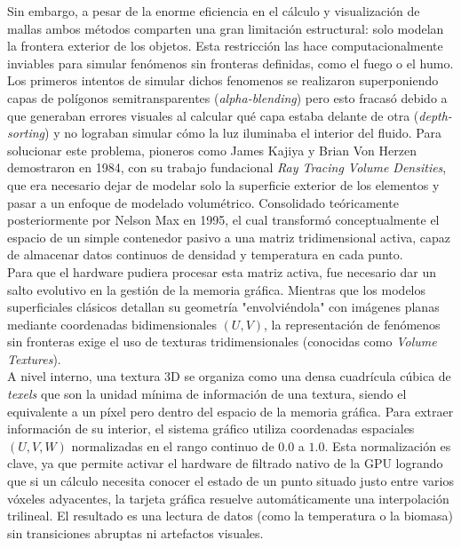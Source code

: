     Sin embargo, a pesar de la enorme eficiencia en el cálculo y visualización de mallas ambos métodos comparten una gran limitación estructural: solo modelan la frontera exterior de los objetos. Esta restricción las hace computacionalmente inviables para simular fenómenos sin fronteras definidas, como el fuego o el humo.\\

    Los primeros intentos de simular dichos fenomenos se realizaron superponiendo capas de polígonos semitransparentes (\textit{alpha-blending}) pero esto fracasó debido a que generaban errores visuales al calcular qué capa estaba delante de otra (\textit{depth-sorting}) y no lograban simular cómo la luz iluminaba el interior del fluido. Para solucionar este problema, pioneros como James Kajiya y Brian Von Herzen demostraron en 1984, con su trabajo fundacional \textit{Ray Tracing Volume Densities}\cite{VolumeDensities}, que era necesario dejar de modelar solo la superficie exterior de los elementos y pasar a un enfoque de modelado volumétrico. Consolidado teóricamente posteriormente por Nelson Max en 1995\cite{max2002optical}, el cual transformó conceptualmente el espacio de un simple contenedor pasivo a una matriz tridimensional activa, capaz de almacenar datos continuos de densidad y temperatura en cada punto. \\

    Para que el hardware pudiera procesar esta matriz activa, fue necesario dar un salto evolutivo en la gestión de la memoria gráfica. Mientras que los modelos superficiales clásicos detallan su geometría "envolviéndola" con imágenes planas mediante coordenadas bidimensionales $ (U, V) $, la representación de fenómenos sin fronteras exige el uso de texturas tridimensionales (conocidas como \textit{Volume Textures}).\\

    A nivel interno, una textura 3D se organiza como una densa cuadrícula cúbica de \textit{texels} que son la unidad mínima de información de una textura, siendo el equivalente a un píxel pero dentro del espacio de la memoria gráfica.  Para extraer información de su interior, el sistema gráfico utiliza coordenadas espaciales $ (U, V, W) $ normalizadas en el rango continuo de $0.0$ a $1.0$. Esta normalización es clave, ya que permite activar el hardware de filtrado nativo de la GPU logrando que si un cálculo necesita conocer el estado de un punto situado justo entre varios vóxeles adyacentes, la tarjeta gráfica resuelve automáticamente una interpolación trilineal. El resultado es una lectura de datos (como la temperatura o la biomasa) sin transiciones abruptas ni artefactos visuales.\\

